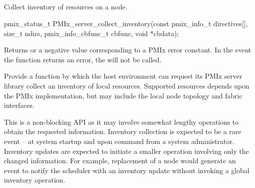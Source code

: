 \subsection{}

\summary

Collect inventory of resources on a node.

\format

\cspecificstart
\begin{codepar}
pmix_status_t
PMIx_server_collect_inventory(const pmix_info_t directives[],
                              size_t ndirs,
                              pmix_info_cbfunc_t cbfunc,
                              void *cbdata);
\end{codepar}
\cspecificend

\begin{arglist}
\end{arglist}

Returns  or a negative value corresponding to a PMIx error constant. In the event the function returns an error, the  will not be called.

\descr

Provide a function by which the host environment can request its \ac{PMIx} server library collect an inventory of local resources. Supported resources depends upon the \ac{PMIx} implementation, but may include the local node topology and fabric interfaces.

\advicermstart
This is a non-blocking \ac{API} as it may involve somewhat lengthy operations to obtain the requested information. Inventory collection is expected to be a rare event – at system startup and upon command from a system administrator. Inventory updates are expected to initiate a smaller operation involving only the changed information. For example, replacement of a node would generate an event to notify the scheduler with an inventory update without invoking a global inventory operation.
\advicermend

